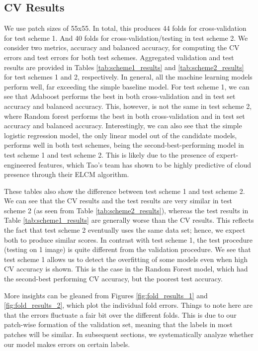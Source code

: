 \documentclass[11pt, letterpaper, journal]{IEEEtran}
\begin{document}
\subsection{CV Results}
\label{sec:cv_results}
We use patch sizes of 55x55. In total, this produces 44 folds for cross-validation for test scheme 1. And 40 folds for cross-validation/testing in test scheme 2. We consider two metrics, accuracy and balanced accuracy, for computing the CV errors and test errors for both test schemes. Aggregated validation and test results are provided in Tables \ref{tab:scheme1_results} and \ref{tab:scheme2_results} for test schemes 1 and 2, respectively. In general, all the machine learning models perform well, far exceeding the simple baseline model. For test scheme 1, we can see that Adaboost performs the best in both cross-validation and in test set accuracy and balanced accuracy. This, however, is not the same in test scheme 2, where Random forest performs the best in both cross-validation and in test set accuracy and balanced accuracy. Interestingly, we can also see that the simple logistic regression model, the only linear model out of the candidate models, performs well in both test schemes, being the second-best-performing model in test scheme 1 and test scheme 2. This is likely due to the presence of expert-engineered features, which Tao's team has shown to be highly predictive of cloud presence through their ELCM algorithm.

These tables also show the difference between test scheme 1 and test scheme 2. We can see that the CV results and the test results are very similar in test scheme 2 (as seen from Table \ref{tab:scheme2_results}), whereas the test results in Table \ref{tab:scheme1_results} are generally worse than the CV results. This reflects the fact that test scheme 2 eventually uses the same data set; hence, we expect both to produce similar scores. In contrast with test scheme 1, the test procedure (testing on 1 image) is quite different from the validation procedure. We see that test scheme 1 allows us to detect the overfitting of some models even when high CV accuracy is shown. This is the case in the Random Forest model, which had the second-best performing CV accuracy, but the poorest test accuracy.

More insights can be gleaned from Figures \ref{fig:fold_results_1} and \ref{fig:fold_results_2}, which plot the individual fold errors. Things to note here are that the errors fluctuate a fair bit over the different folds. This is due to our patch-wise formation of the validation set, meaning that the labels in most patches will be similar. In subsequent sections, we systematically analyze whether our model makes errors on certain labels. 
\end{document}
